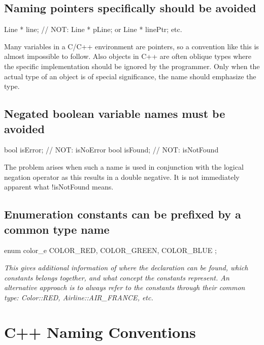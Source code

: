 \documentclass[a4paper,11pt,oneside]{scrbook}
\newcommand{\guideline}[1]{{\subsection{#1}}}
\newcommand{\motivation}[1]{{\normalfont \itshape #1}}
\newcommand{\trcode}[1]{{\normalfont \ttfamily #1}}
\begin{document}
\guideline{Naming pointers specifically should be avoided}

\begin{code}
  Line * line;  // NOT: Line * pLine; or Line * linePtr; etc. 
\end{code}

Many variables in a C/C++ environment are pointers, so a convention like this is
almost impossible to follow. Also objects in C++ are often oblique types where
the specific implementation should be ignored by the programmer. Only when the
actual type of an object is of special significance, the name should emphasize
the type.

\guideline{Negated boolean variable names must be avoided}

\begin{code}
  bool isError; // NOT: isNoError
  bool isFound; // NOT: isNotFound 
\end{code}

The problem arises when such a name is used in conjunction with the logical
negation operator as this results in a double negative. It is not immediately
apparent what \trcode{!isNotFound} means.

\guideline{Enumeration constants can be prefixed by a common type name}

\begin{code}
  enum color_e {
    COLOR_RED,
    COLOR_GREEN,
    COLOR_BLUE
  }; 
\end{code}

\motivation{
  This gives additional information of where the declaration can be found, which
  constants belongs together, and what concept the constants represent. An
  alternative approach is to always refer to the constants through their common
  type: \trcode{Color::RED}, \trcode{Airline::AIR\_FRANCE}, etc.
}

\section{C++ Naming Conventions}
\end{document}
